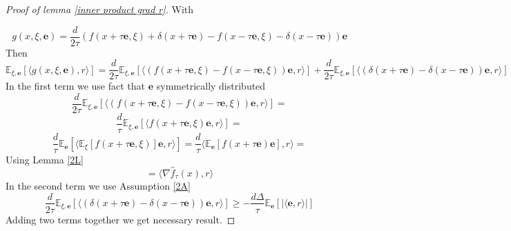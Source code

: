 \documentclass{article}
\theoremstyle{definition}
\theoremstyle{remark}
\def\EE{\mathbb{E}}
\begin{document}
\begin{proof}[Proof of lemma \ref{inner product grad r}]
With

$$g(x, \xi, \mathbf{e}) = \frac{d}{2\tau}(f(x + \tau \mathbf{e}, \xi) + \delta(x + \tau \mathbf{e}) - f(x - \tau \mathbf{e}, \xi) - \delta(x - \tau \mathbf{e})) \mathbf{e}$$
Then
$$\EE_{\xi, \mathbf{e}} [\langle g(x,\xi, \mathbf{e}), r \rangle] = \frac{d}{2\tau}\EE_{\xi, \mathbf{e}} [\langle (f(x + \tau \mathbf{e}, \xi) - f(x - \tau \mathbf{e}, \xi))\mathbf{e}, r \rangle]  + \frac{d}{2\tau}\EE_{\xi, \mathbf{e}} [\langle (\delta(x + \tau \mathbf{e})  - \delta(x - \tau \mathbf{e}))\mathbf{e}, r \rangle] $$
In the first term we use  fact that $\mathbf{e}$ symmetrically distributed
$$ \frac{d}{2\tau}\EE_{\xi, \mathbf{e}} [\langle (f(x + \tau \mathbf{e}, \xi) - f(x - \tau \mathbf{e}, \xi))\mathbf{e}, r \rangle] = $$
$$ \frac{d}{\tau}\EE_{\xi, \mathbf{e}} [\langle f(x + \tau \mathbf{e}, \xi) \mathbf{e}, r \rangle] = $$
$$ \frac{d}{\tau}\EE_{ \mathbf{e}} [\langle \EE_{\xi}[f(x + \tau \mathbf{e}, \xi)] \mathbf{e}, r \rangle] = \frac{d}{\tau} \langle \EE_{ \mathbf{e}} [f(x + \tau \mathbf{e}) \mathbf{e}], r \rangle =$$
Using Lemma \ref{2L}
$$= \langle \nabla \hat{f}_\tau(x), r \rangle$$
In the second term we use Assumption \ref{2A}
$$\frac{d}{2\tau}\EE_{\xi, \mathbf{e}} [\langle (\delta(x + \tau \mathbf{e})  - \delta(x - \tau \mathbf{e}))\mathbf{e}, r \rangle] \geq - \frac{d\Delta}{\tau} \EE_\mathbf{e}[|\langle \mathbf{e}, r \rangle|]$$
Adding two terms together we get necessary result.
\end{proof}
\end{document}
